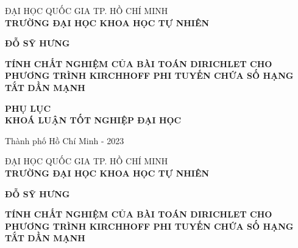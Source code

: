 \documentclass[12pt,a4paper]{article}
\theoremstyle{definition}
\begin{document}
\begin{titlepage}

\thispagestyle{empty}

\begin{center}
\vspace*{0.3cm}
{\fontsize{14}{1}\selectfont  ĐẠI HỌC QUỐC GIA TP. HỒ CHÍ MINH}\\
{\fontsize{14}{1}\selectfont\bf TRƯỜNG ĐẠI HỌC KHOA HỌC TỰ NHIÊN}\\
\hfill

\vspace*{3cm}

{\fontsize{14}{1}\selectfont\bf ĐỖ SỸ HƯNG}

\vspace*{3cm}

{\fontsize{16}{1}\selectfont \bf { TÍNH CHẤT NGHIỆM CỦA BÀI TOÁN DIRICHLET CHO PHƯƠNG TRÌNH KIRCHHOFF PHI TUYẾN CHỨA SỐ HẠNG TẮT DẦN MẠNH }}

\vspace*{4cm}

{\fontsize{14}{1}\selectfont\bf PHỤ LỤC \\ KHOÁ LUẬN TỐT NGHIỆP ĐẠI HỌC}

\vfill

{\fontsize{12}{1}\selectfont Thành phố Hồ Chí Minh - 2023}
\end{center}
\vspace*{0.5cm}


\end{titlepage}

\newpage
\thispagestyle{empty}


\begin{center}
\vspace*{0.3cm}
{\fontsize{14}{1}\selectfont  ĐẠI HỌC QUỐC GIA TP. HỒ CHÍ MINH}\\
{\fontsize{14}{1}\selectfont\bf TRƯỜNG ĐẠI HỌC KHOA HỌC TỰ NHIÊN}\\
\vspace*{3cm}

{\fontsize{14}{1}\selectfont\bf ĐỖ SỸ HƯNG}

\vspace*{3cm}

{\fontsize{16}{1}\selectfont \bf {TÍNH CHẤT NGHIỆM CỦA BÀI TOÁN DIRICHLET CHO PHƯƠNG TRÌNH KIRCHHOFF PHI TUYẾN CHỨA SỐ HẠNG TẮT DẦN MẠNH
}}

\vspace*{2cm}

\end{center}
 
\end{document}
